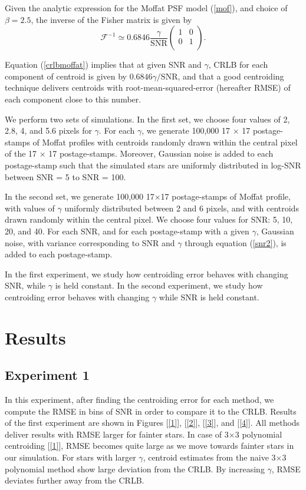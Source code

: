 \documentclass[12pt, preprint]{aastex}
\newcommand{\beq}{\begin{equation}}
\newcommand{\eeq}{\end{equation}}
\begin{document}
Given the analytic expression for the Moffat PSF model (\ref{mof}), and choice of $\beta=2.5$, 
the inverse of the Fisher matrix is given by
\beq
  \mathcal{F}^{-1} \simeq 0.6846 \frac{\gamma}{\text{SNR}} 
  \begin{pmatrix}
      1 & 0\\
      0 & 1\\
  \end{pmatrix}.
\label{crlbmoffat}
\eeq

Equation (\ref{crlbmoffat}) implies that at given SNR and $\gamma$,
CRLB for each component of centroid is given by $0.6846\gamma/\text{SNR}$,
and that a good centroiding technique delivers centroids with
root-mean-squared-error (hereafter RMSE) of each component close to
this number. 

We perform two sets of simulations. In the first set, we choose four values of
2, 2.8, 4, and 5.6 pixels for $\gamma$. For each $\gamma$, we generate 100,000 
17 $\times$ 17 postage-stamps of Moffat profiles with centroids randomly drawn
within the central pixel of the 17 $\times$ 17 postage-stamps. Moreover, Gaussian
noise is added to each postage-stamp such that the simulated stars are uniformly
 distributed in log-SNR between SNR = 5 to SNR = 100.

In the second set, we generate 100,000 17$\times$17 postage-stamps
of Moffat profile, with values of $\gamma$ uniformly distributed 
between 2 and 6 pixels, and with centroids drawn randomly within 
the central pixel. We choose four values for SNR: 5, 10, 20, and 40. 
For each SNR, and for each postage-stamp with a given $\gamma$, 
Gaussian noise, with variance corresponding to SNR and $\gamma$ through equation 
(\ref{snr2}), is added to each postage-stamp.

In the first experiment, we study how centroiding error behaves with changing
SNR, while $\gamma$ is held constant. In the second experiment, we study 
how centroiding error behaves with changing $\gamma$ while SNR is held constant.


\section{Results}\label{sec:results}

\subsection{Experiment 1}
   
In this experiment, after finding the centroiding error for each method,
we compute the RMSE in bins of SNR in order to compare it to the CRLB. 
Results of the first experiment are shown in Figures [\ref{1}], [\ref{2}],
[\ref{3}], and [\ref{4}]. All methods deliver results
with RMSE larger for fainter stars.
In case of 3$\times$3 polynomial centroiding [\ref{1}], RMSE becomes
quite large as we move towards fainter stars in our simulation.
For stars with larger $\gamma$, centroid estimates from the naive 3$\times$3
 polynomial method show large deviation from the CRLB. By increasing $\gamma$,
RMSE deviates further away from the CRLB.
\end{document}
